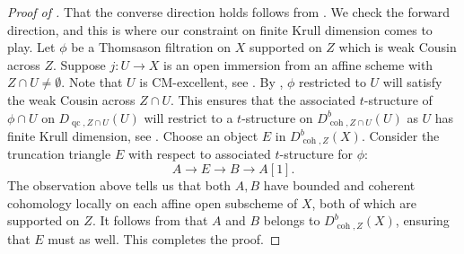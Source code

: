\documentclass[11pt]{amsart}
\theoremstyle{plain}
\theoremstyle{definition}
\numberwithin{equation}{section}
\numberwithin{theorem}{section}
\begin{document}
\begin{proof}
    [Proof of ]
    That the converse direction holds follows from  . 
    We check the forward direction, and this is where our constraint on finite Krull dimension comes to play. Let $\phi$ be a Thomsason filtration on $X$ supported on $Z$ which is weak Cousin across $Z$. Suppose $j\colon U \to X$ is an open immersion from an affine scheme with $Z\cap U\not=\emptyset$. Note that $U$ is CM-excellent, see . By , $\phi$ restricted to $U$ will satisfy the weak Cousin across $Z\cap U$. This ensures that the associated $t$-structure of $\phi\cap U$ on $D_{\operatorname{qc},Z\cap U}(U)$ will restrict to a $t$-structure on $D^b_{\operatorname{coh},Z\cap U}(U)$ as $U$ has finite Krull dimension, see . Choose an object $E$ in $D^b_{\operatorname{coh},Z}(X)$. Consider the truncation triangle $E$ with respect to associated $t$-structure for $\phi$:
    \begin{displaymath}
        A \to E \to B \to A[1].
    \end{displaymath}
    The observation above tells us that both $A,B$ have bounded and coherent cohomology locally on each affine open subscheme of $X$, both of which are supported on $Z$. It follows from  that $A$ and $B$ belongs to $D^b_{\operatorname{coh},Z}(X)$, ensuring that $E$ must as well. This completes the proof.
\end{proof}
\end{document}
